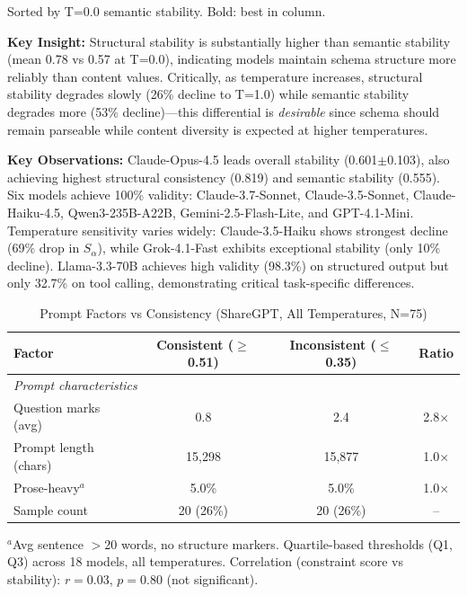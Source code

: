 \documentclass{article}
\theoremstyle{plain}
\theoremstyle{definition}
\begin{document}
\begin{table}[t]
\vspace{0.5em}
\raggedright\small Sorted by T=0.0 semantic stability. Bold: best in column.
\end{table}

\textbf{Key Insight:} Structural stability is substantially higher than semantic stability (mean 0.78 vs 0.57 at T=0.0), indicating models maintain schema structure more reliably than content values. Critically, as temperature increases, structural stability degrades slowly (26\% decline to T=1.0) while semantic stability degrades more (53\% decline)---this differential is \textit{desirable} since schema should remain parseable while content diversity is expected at higher temperatures.

\textbf{Key Observations:} Claude-Opus-4.5 leads overall stability (0.601$\pm$0.103), also achieving highest structural consistency (0.819) and semantic stability (0.555). Six models achieve 100\% validity: Claude-3.7-Sonnet, Claude-3.5-Sonnet, Claude-Haiku-4.5, Qwen3-235B-A22B, Gemini-2.5-Flash-Lite, and GPT-4.1-Mini. Temperature sensitivity varies widely: Claude-3.5-Haiku shows strongest decline (69\% drop in $S_\alpha$), while Grok-4.1-Fast exhibits exceptional stability (only 10\% decline). Llama-3.3-70B achieves high validity (98.3\%) on structured output but only 32.7\% on tool calling, demonstrating critical task-specific differences.

\begin{table}[h]
\centering
\caption{Prompt Factors vs Consistency (ShareGPT, All Temperatures, N=75)}
\label{tab:sharegpt-complexity-correlation}
\scriptsize
\begin{tabular}{@{}lccc@{}}
\toprule
\textbf{Factor} & \textbf{Consistent ($\geq$0.51)} & \textbf{Inconsistent ($\leq$0.35)} & \textbf{Ratio} \\
\midrule
\multicolumn{4}{l}{\textit{Prompt characteristics}} \\
Question marks (avg) & 0.8 & 2.4 & 2.8$\times$ \\
Prompt length (chars) & 15,298 & 15,877 & 1.0$\times$ \\
Prose-heavy$^a$ & 5.0\% & 5.0\% & 1.0$\times$ \\
\midrule
Sample count & 20 (26\%) & 20 (26\%) & -- \\
\bottomrule
\end{tabular}

\vspace{0.3em}
\raggedright\scriptsize $^a$Avg sentence $>$20 words, no structure markers. Quartile-based thresholds (Q1, Q3) across 18 models, all temperatures. Correlation (constraint score vs stability): $r = 0.03$, $p = 0.80$ (not significant).
\end{table}
\end{document}
